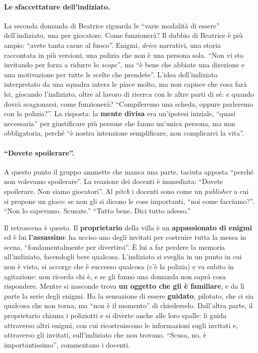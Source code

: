 \paragraph{Le sfaccettature dell'indiziato.} La seconda domanda di Beatrice riguarda le
``varie modalità di essere'' dell'indiziato, una per giocatore. Come funzionerà? Il
dubbio di Beatrice è più ampio: ``avete tanta carne al fuoco''. Enigmi, \emph{drive}
narrativi, una storia raccontata in più versioni, una polizia che non è una persona sola.
``Non vi sto invitando per forza a ridurre lo \emph{scope}'', ma ``è bene che abbiate una
direzione e una motivazione per tutte le scelte che prendete''. L'idea dell'indiziato
interpretato da una squadra intera le piace molto, ma non capisce che cosa farà lei,
giocando l'indiziato, oltre al lavoro di ricerca con le altre parti di sé: e quando
dovrà scagionarsi, come funzionerà? ``Compileremo una scheda, oppure parleremo con la
polizia?''. La risposta: la \textbf{mente divisa} era un'ipotesi iniziale, ``quasi
necessaria'' per giustificare più persone che fanno un'unica persona, ma non
obbligatoria, perché ``è nostra intenzione semplificare, non complicarci la vita''.

\paragraph{``Dovete spoilerare''.} A questo punto il gruppo ammette che manca una parte,
taciuta apposta ``perché non volevamo spoilerare''. La reazione dei docenti è immediata:
``Dovete spoilerare. Non siamo giocatori''. Al \emph{pitch} i docenti sono come un
\emph{publisher} a cui si propone un gioco: se non gli si dicono le cose importanti,
``noi come facciamo?''. ``Non lo sapevamo. Scusate.'' ``Tutto bene. Dici tutto adesso.''

Il retroscena è questo. Il \textbf{proprietario} della villa è un \textbf{appassionato di
enigmi} ed è lui \textbf{l'assassino}: ha ucciso uno degli invitati per costruire tutta
la messa in scena, ``fondamentalmente per divertirsi''. È lui a far perdere la memoria
all'indiziato, facendogli bere qualcosa. L'indiziato si sveglia in un punto in cui non è
visto, si accorge che è successo qualcosa (c'è la polizia) e va subito in agitazione:
non ricorda chi è, e se gli fanno una domanda non saprà cosa rispondere. Mentre si
nasconde trova \textbf{un oggetto che gli è familiare}, e da lì parte la serie degli
enigmi. Ha la sensazione di essere \textbf{guidato}, pilotato, che ci sia qualcosa che
non torna, ma ``non è il momento'' di chiederselo. Dall'altra parte, il proprietario
chiama i poliziotti e si diverte anche alle loro spalle: li guida attraverso altri
enigmi, con cui ricostruiscono le informazioni sugli invitati e, attraverso gli invitati,
sull'indiziato che non trovano. ``Scusa, no, è importantissimo'', commentano i docenti.

